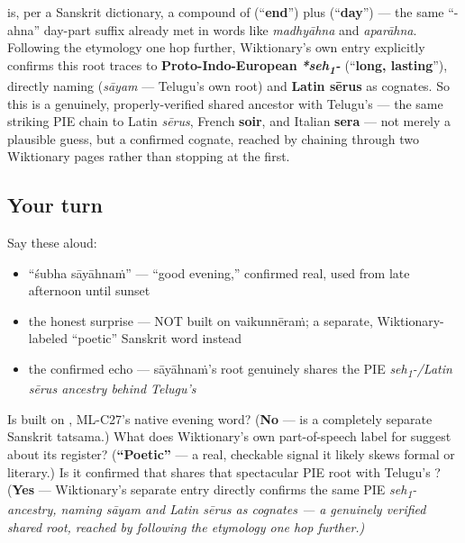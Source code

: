 \begin{culture}
\textbf{} is, per a Sanskrit dictionary, a compound of \textbf{} (\textquotedblleft{}\textbf{end}\textquotedblright{}) plus \textbf{} (\textquotedblleft{}\textbf{day}\textquotedblright{}) — the same \textquotedblleft{}-ahna\textquotedblright{} day-part suffix already met in words like \emph{madhyāhna} and \emph{aparāhna}. Following the etymology one hop further, Wiktionary's own \textbf{} entry explicitly confirms this root traces to \textbf{Proto-Indo-European} \emph{\textbf{*seh\textsubscript{1}-}} (\textquotedblleft{}\textbf{long, lasting}\textquotedblright{}), directly naming \textbf{} (\emph{sāyam} — Telugu's own root) and \textbf{Latin sērus} as cognates. So this is a genuinely, properly-verified shared ancestor with Telugu's \textbf{} — the same striking PIE chain to Latin \emph{sērus}, French \textbf{soir}, and Italian \textbf{sera} — not merely a plausible guess, but a confirmed cognate, reached by chaining through two Wiktionary pages rather than stopping at the first.
\end{culture}

\subsection*{Your turn}
Say these aloud:

\begin{itemize}
\raggedright
  \item \textquotedblleft{}śubha sāyāhnaṁ\textquotedblright{} — \textquotedblleft{}good evening,\textquotedblright{} confirmed real, used from late afternoon until sunset
  \item the honest surprise — NOT built on vaikunnēraṁ; a separate, Wiktionary-labeled \textquotedblleft{}poetic\textquotedblright{} Sanskrit word instead
  \item the confirmed echo — sāyāhnaṁ's  root genuinely shares the PIE \emph{seh\textsubscript{1}-/Latin sērus ancestry behind Telugu's }
\end{itemize}

\begin{tcolorbox}[breakable,colback=teal!4,colframe=teal!35!black,title={Before you move on}]
Is   built on , ML-C27's native evening word? (\textbf{No} —  is a completely separate Sanskrit tatsama.) What does Wiktionary's own part-of-speech label for  suggest about its register? (\textbf{\textquotedblleft{}Poetic\textquotedblright{}} — a real, checkable signal it likely skews formal or literary.) Is it confirmed that  shares that spectacular PIE root with Telugu's ? (\textbf{Yes} — Wiktionary's separate  entry directly confirms the same PIE \emph{seh\textsubscript{1}- ancestry, naming sāyam and Latin sērus as cognates — a genuinely verified shared root, reached by following the etymology one hop further.)}
\end{tcolorbox}
